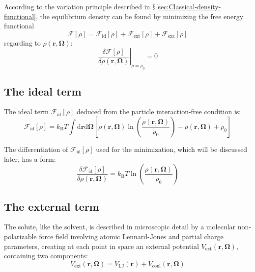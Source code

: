 According to the variation principle described in $\mathsection$\ref{sec:Classical-density-functional},
the equilibrium density can be found by minimizing the free energy
functional
\begin{equation}
\mathcal{F}[\rho]=\mathcal{F}_{\mathrm{id}}[\rho]+\mathcal{F}_{\mathrm{ext}}[\rho]+\mathcal{F}_{\mathrm{exc}}[\rho]\label{eq:4.fff}
\end{equation}
regarding to $\rho(\mathbf{r},\mathbf{\Omega})$:
\begin{equation}
\left.\frac{\delta\mathcal{F}[\rho]}{\delta\rho(\mathbf{r},\mathbf{\Omega})}\right|_{\rho=\rho_{0}}=0
\end{equation}


\subsection{The ideal term}

The ideal term $\mathcal{F}_{\mathrm{id}}[\rho]$ deduced from the
particle interaction-free condition is:
\begin{equation}
\mathcal{F}_{\mathrm{id}}[\rho]=k_{\mathrm{B}}T\int\mathrm{d}\mathbf{r}\mathrm{d}\mathbf{\Omega}\left[\rho(\mathbf{r},\mathbf{\mathbf{\mathbf{\Omega}}})\ln\left(\frac{\rho(\mathbf{r},\mathbf{\mathbf{\mathbf{\mathbf{\Omega}}}})}{\rho_{0}}\right)-\rho(\mathbf{r},\mathbf{\mathbf{\mathbf{\Omega}}})+\rho_{0}\right]
\end{equation}

The differentiation of $\mathcal{F}_{\mathrm{id}}[\rho]$ used for
the minimization, which will be discussed later, has a form:
\begin{equation}
\frac{\delta\mathcal{F}_{\mathrm{id}}[\rho]}{\delta\rho(\mathbf{r},\mathbf{\Omega})}=k_{\mathrm{B}}T\ln\left(\dfrac{\rho(\mathbf{r},\mathbf{\Omega})}{\rho_{0}}\right)
\end{equation}


\subsection{The external term\label{subsec:The-external-term}}

The solute, like the solvent, is described in microscopic detail by
a molecular non-polarizable force field involving atomic Lennard-Jones
and partial charge parameters, creating at each point in space an
external potential $V_{\mathrm{ext}}(\mathbf{r},\mathbf{\mathbf{\mathbf{\mathbf{\Omega}}}})$,
containing two components:
\begin{equation}
V_{\mathrm{ext}}(\mathbf{r},\mathbf{\Omega})=V_{\mathrm{LJ}}(\mathbf{r})+V_{\mathrm{coul}}(\mathbf{r},\mathbf{\Omega})
\end{equation}

